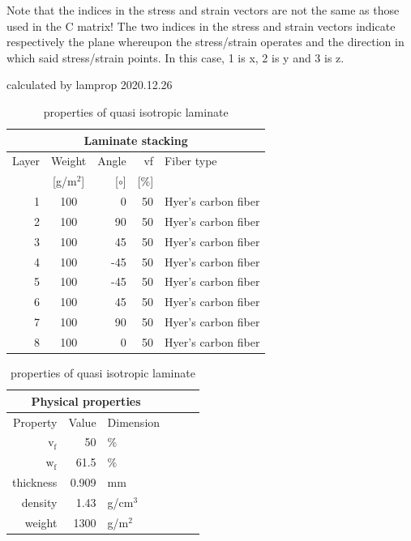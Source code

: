 \documentclass[a4paper,landscape,oneside,11pt,twocolumn]{memoir}
\begin{document}
Note that the indices in the stress and strain vectors are not the same as
those used in the C matrix!
The two indices in the stress and strain vectors indicate respectively the
plane whereupon the stress/strain operates and the direction in which said
stress/strain points.
In this case, 1 is x, 2 is y and 3 is z.

\begin{table}[!htbp]
  \renewcommand{\arraystretch}{1.2}
  \caption{\label{tab:quasi-isotropic-mat}properties of quasi isotropic laminate}
  \centering\footnotesize{\rule{0pt}{10pt}
  \tiny calculated by lamprop 2020.12.26\\[3pt]}
    \begin{tabular}[t]{rcrrl}
      \multicolumn{5}{c}{\small\textbf{Laminate stacking}}\\[0.1em]
      \toprule %
      Layer & Weight & Angle & vf & Fiber type\\
            & [g/m$^2$] & [$\circ$] & [\%]\\
      \midrule
      1 &  100 &     0 & 50 & Hyer's carbon fiber\\
      2 &  100 &    90 & 50 & Hyer's carbon fiber\\
      3 &  100 &    45 & 50 & Hyer's carbon fiber\\
      4 &  100 &   -45 & 50 & Hyer's carbon fiber\\
      5 &  100 &   -45 & 50 & Hyer's carbon fiber\\
      6 &  100 &    45 & 50 & Hyer's carbon fiber\\
      7 &  100 &    90 & 50 & Hyer's carbon fiber\\
      8 &  100 &     0 & 50 & Hyer's carbon fiber\\
      \bottomrule
    \end{tabular}\hspace{0.02\textwidth}
    \begin{tabular}[t]{rrlrrl}
      \multicolumn{3}{c}{\small\textbf{Physical properties}}\\[0.1em]
      \toprule
      Property & Value & Dimension\\
      \midrule
      $\mathrm{v_f}$ & 50 &\%\\
      $\mathrm{w_f}$ & 61.5 &\%\\
      thickness & 0.909 & mm\\
      density & 1.43 & g/cm$^3$\\
      weight & 1300 & g/m$^2$\\

\end{tabular}
\end{table}
\end{document}
